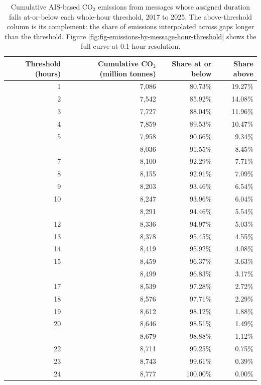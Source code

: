 \begin{table}[!h]
\centering
\caption{\label{tab:emissions_by_message_hour_threshold}Cumulative AIS-based CO$_2$ emissions from messages whose assigned duration falls at-or-below each whole-hour threshold, 2017 to 2025. The above-threshold column is its complement: the share of emissions interpolated across gaps longer than the threshold. Figure \ref{fig:fig-emissions-by-message-hour-threshold} shows the full curve at 0.1-hour resolution.}
\centering
\fontsize{8}{10}\selectfont
\begin{tabular}[t]{rrrr}
\toprule
Threshold (hours) & Cumulative CO$_2$ (million tonnes) & Share at or below & Share above\\
\midrule
1 & 7,086 & 80.73\% & 19.27\%\\
2 & 7,542 & 85.92\% & 14.08\%\\
3 & 7,727 & 88.04\% & 11.96\%\\
4 & 7,859 & 89.53\% & 10.47\%\\
5 & 7,958 & 90.66\% & 9.34\%\\
\addlinespace
6 & 8,036 & 91.55\% & 8.45\%\\
7 & 8,100 & 92.29\% & 7.71\%\\
8 & 8,155 & 92.91\% & 7.09\%\\
9 & 8,203 & 93.46\% & 6.54\%\\
10 & 8,247 & 93.96\% & 6.04\%\\
\addlinespace
11 & 8,291 & 94.46\% & 5.54\%\\
12 & 8,336 & 94.97\% & 5.03\%\\
13 & 8,378 & 95.45\% & 4.55\%\\
14 & 8,419 & 95.92\% & 4.08\%\\
15 & 8,459 & 96.37\% & 3.63\%\\
\addlinespace
16 & 8,499 & 96.83\% & 3.17\%\\
17 & 8,539 & 97.28\% & 2.72\%\\
18 & 8,576 & 97.71\% & 2.29\%\\
19 & 8,612 & 98.12\% & 1.88\%\\
20 & 8,646 & 98.51\% & 1.49\%\\
\addlinespace
21 & 8,679 & 98.88\% & 1.12\%\\
22 & 8,711 & 99.25\% & 0.75\%\\
23 & 8,743 & 99.61\% & 0.39\%\\
24 & 8,777 & 100.00\% & 0.00\%\\
\bottomrule
\end{tabular}
\end{table}
